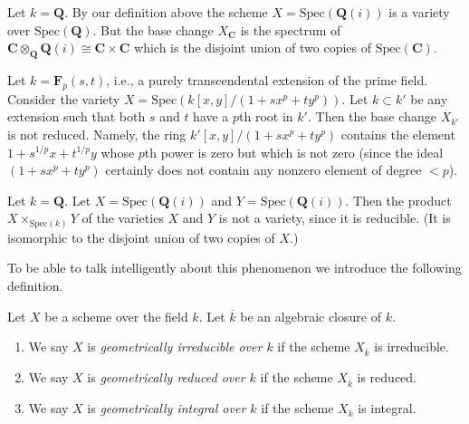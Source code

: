 \begin{example}
\label{example-not-geometrically-irreducible}
Let $k = \mathbf{Q}$. By our definition above the scheme
$X = \text{Spec}(\mathbf{Q}(i))$ is a variety over $\text{Spec}(\mathbf{Q})$.
But the base change $X_{\mathbf{C}}$ is the spectrum of
$\mathbf{C} \otimes_{\mathbf{Q}} \mathbf{Q}(i) \cong
\mathbf{C} \times \mathbf{C}$ which is the disjoint union of
two copies of $\text{Spec}(\mathbf{C})$.
\end{example}

\begin{example}
\label{example-not-geometrically-reduced}
Let $k = \mathbf{F}_p(s,t)$, i.e., a purely transcendental extension
of the prime field. Consider the variety
$X = \text{Spec}(k[x,y]/(1 + sx^p + ty^p))$.
Let $k \subset k'$ be any extension such that
both $s$ and $t$ have a $p$th root in $k'$.
Then the base change $X_{k'}$ is not reduced.
Namely, the ring $k'[x, y]/(1 + s x^p + ty^p)$ contains the element
$1 + s^{1/p}x + t^{1/p}y$ whose $p$th power is zero but
which is not zero (since the ideal $(1 + sx^p + ty^p)$ certainly
does not contain any nonzero element of degree $< p$).
\end{example}

\begin{example}
\label{example-product-not-a-variety}
Let $k = \mathbf{Q}$. Let $X = \text{Spec}(\mathbf{Q}(i))$
and $Y = \text{Spec}(\mathbf{Q}(i))$. Then the product
$X \times_{\text{Spec}(k)} Y$ of the varieties $X$ and $Y$
is not a variety, since it is reducible. (It is isomorphic
to the disjoint union of two copies of $X$.)
\end{example}

\noindent
To be able to talk intelligently about this phenomenon we introduce
the following definition.

\begin{definition}
\label{definition-geometrically-integral}
Let $X$ be a scheme over the field $k$.
Let $\overline{k}$ be an algebraic closure of $k$.
\begin{enumerate}
\item We say $X$ is {\it geometrically irreducible over $k$} 
if the scheme $X_{\overline{k}}$ is irreducible.
\item We say $X$ is {\it geometrically reduced over $k$}
if the scheme $X_{\overline{k}}$ is reduced.
\item We say $X$ is {\it geometrically integral over $k$}
if the scheme $X_{\overline{k}}$ is integral.
\end{enumerate}
\end{definition}

